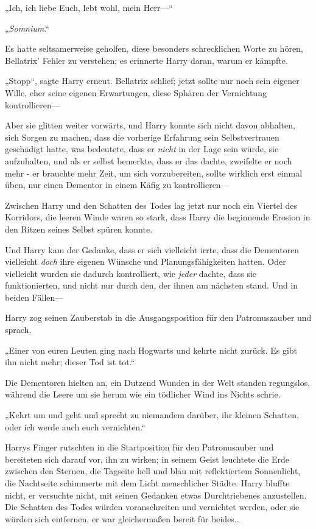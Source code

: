 {„Ich, ich liebe Euch, lebt wohl, mein Herr—“

„\emph{Somnium}.“

Es hatte seltsamerweise geholfen, diese besonders schrecklichen Worte zu hören, Bellatrix' Fehler zu verstehen; es erinnerte Harry daran, warum er kämpfte.

„Stopp“, sagte Harry erneut. Bellatrix schlief; jetzt sollte nur noch sein eigener Wille, eher seine eigenen Erwartungen, diese Sphären der Vernichtung kontrollieren—

Aber sie glitten weiter vorwärts, und Harry konnte sich nicht davon abhalten, sich Sorgen zu machen, dass die vorherige Erfahrung sein Selbstvertrauen geschädigt hatte, was bedeutete, dass er \emph{nicht} in der Lage sein würde, sie aufzuhalten, und als er selbst bemerkte, dass er das dachte, zweifelte er noch mehr - er brauchte mehr Zeit, um sich vorzubereiten, sollte wirklich erst einmal üben, nur einen Dementor in einem Käfig zu kontrollieren—

Zwischen Harry und den Schatten des Todes lag jetzt nur noch ein Viertel des Korridors, die leeren Winde waren so stark, dass Harry die beginnende Erosion in den Ritzen seines Selbst spüren konnte.

Und Harry kam der Gedanke, dass er sich vielleicht irrte, dass die Dementoren vielleicht \emph{doch} ihre eigenen Wünsche und Planungsfähigkeiten hatten. Oder vielleicht wurden sie dadurch kontrolliert, wie \emph{jeder} dachte, dass sie funktionierten, und nicht nur durch den, der ihnen am nächsten stand. Und in beiden Fällen—

Harry zog seinen Zauberstab in die Ausgangsposition für den Patronuszauber und sprach.

„Einer von euren Leuten ging nach Hogwarts und kehrte nicht zurück. Es gibt ihn nicht mehr; dieser Tod ist tot.“

Die Dementoren hielten an, ein Dutzend Wunden in der Welt standen regungslos, während die Leere um sie herum wie ein tödlicher Wind ins Nichts schrie.

„Kehrt um und geht und sprecht zu niemandem darüber, ihr kleinen Schatten, oder ich werde auch euch vernichten.“

Harrys Finger rutschten in die Startposition für den Patronusauber und bereiteten sich darauf vor, ihn zu wirken; in seinem Geist leuchtete die Erde zwischen den Sternen, die Tagseite hell und blau mit reflektiertem Sonnenlicht, die Nachtseite schimmerte mit dem Licht menschlicher Städte. Harry bluffte nicht, er versuchte nicht, mit seinen Gedanken etwas Durchtriebenes anzustellen. Die Schatten des Todes würden voranschreiten und vernichtet werden, oder sie würden sich entfernen, er war gleichermaßen bereit für beides…

}
